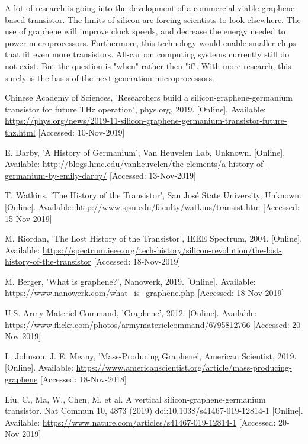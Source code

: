 \documentclass[conference, 10pt]{IEEEtran}
\begin{document}
A lot of research is going into the development of a commercial viable graphene-based transistor. The limits of silicon are forcing scientists to look elsewhere. The use of graphene will improve clock speeds, and decrease the energy needed to power microprocessors. Furthermore, this technology would enable smaller chips that fit even more transistors. All-carbon computing systems currently still do not exist. But the question is "when" rather then "if". With more research, this surely is the basis of the next-generation microprocessors.\\



\begin{thebibliography}{00}

 Chinese Academy of Sciences, 'Researchers build a silicon-graphene-germanium transistor for future THz operation', phys.org, 2019. [Online]. Available: \url{https://phys.org/news/2019-11-silicon-graphene-germanium-transistor-future-thz.html} [Accessed: 10-Nov-2019]

 E. Darby, 'A History of Germanium', Van Heuvelen Lab, Unknown. [Online]. Available: \url{http://blogs.hmc.edu/vanheuvelen/the-elements/a-history-of-germanium-by-emily-darby/} [Accessed: 13-Nov-2019]

 T. Watkins, 'The History of the Transistor', San José State University, Unknown. [Online]. Available: \url{http://www.sjsu.edu/faculty/watkins/transist.htm} [Accessed: 15-Nov-2019]

 M. Riordan, 'The Lost History of the Transistor', IEEE Spectrum, 2004. [Online]. Available: \url{https://spectrum.ieee.org/tech-history/silicon-revolution/the-lost-history-of-the-transistor} [Accessed: 18-Nov-2019]

  M. Berger, 'What is graphene?', Nanowerk, 2019. [Online]. Available: \url{https://www.nanowerk.com/what_is_graphene.php} [Accessed: 18-Nov-2019]

 U.S. Army Materiel Command, 'Graphene', 2012. [Online]. Available: \url{https://www.flickr.com/photos/armymaterielcommand/6795812766} [Accessed: 20-Nov-2019]

 L. Johnson, J. E. Meany, 'Mass-Producing Graphene', American Scientist, 2019. [Online]. Available: \url{https://www.americanscientist.org/article/mass-producing-graphene} [Accessed: 18-Nov-2018]

  Liu, C., Ma, W., Chen, M. et al. A vertical silicon-graphene-germanium transistor. Nat Commun 10, 4873 (2019) doi:10.1038/s41467-019-12814-1 [Online]. Available: \url{https://www.nature.com/articles/s41467-019-12814-1} [Accessed: 20-Nov-2019]


\end{thebibliography}
\end{document}
